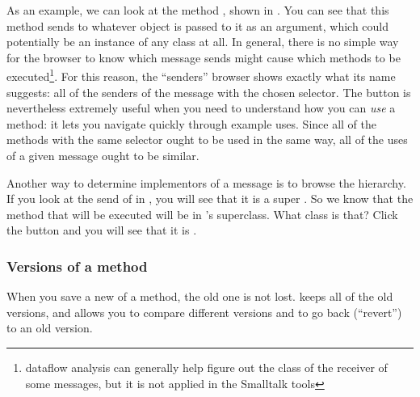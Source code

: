 \documentclass[a4paper,10pt,twoside]{book}
\begin{document}
As an example, we can look at the method , shown in .
You can see that this method sends  to whatever object is passed to it as an argument, which could potentially be an instance of any class at all.
In general, there is no simple way for the browser to know which message sends might cause which methods to be executed\footnote{dataflow analysis can generally help figure out the class of the receiver of some messages, but it is not applied in the Smalltalk tools}.
For this reason,  the ``senders'' browser shows exactly what its name suggests: all of the senders of the message with the chosen selector.
The  button is nevertheless extremely useful when you need to understand how you can \emph{use} a method: it lets you navigate quickly through example uses.
Since all of the methods with the same selector ought to be used in the same way, all of the uses of a given message ought to be similar.

Another way to determine implementors of a message is to browse the hierarchy. If you look at the send of  in , you will see that it is a super .
So we know that the method that will be executed will be in 's superclass.
What class is that?
Click the  button and you will see that it is .


\subsubsection{Versions of a method}
\label{sec:versions}

When you save a new  of a method, the old one is not lost.
\sq keeps all of the old versions, and allows you to compare different versions and to go back (``revert'') to an old version.
\end{document}

